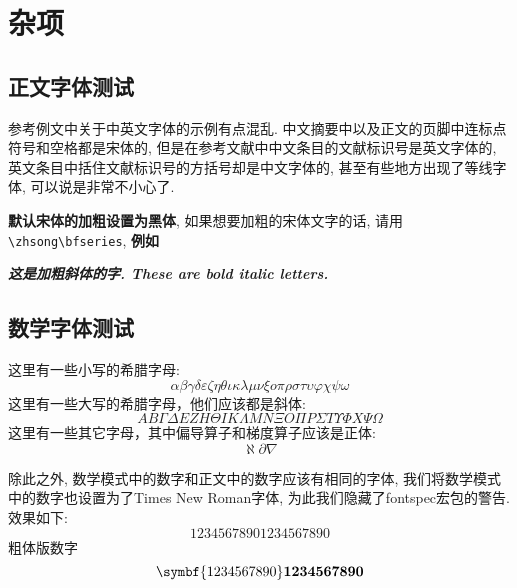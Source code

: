 
\section{杂项}

\subsection{正文字体测试}

参考例文中关于中英文字体的示例有点混乱. 中文摘要中以及正文的页脚中连标点符号和空格都是宋体的, 但是在参考文献中中文条目的文献标识号是英文字体的, 英文条目中括住文献标识号的方括号却是中文字体的, 甚至有些地方出现了等线字体, 可以说是非常不小心了.

{\bfseries 默认宋体的加粗设置为黑体}, 如果想要加粗的宋体文字的话, 请用\verb|\zhsong\bfseries|, {\zhsong\bfseries 例如\zhlipsum[1]}

{\bfseries\itshape 这是加粗斜体的字. These are bold italic letters. \zhlipsum[1]\lipsum[1]}

\subsection{数学字体测试}

这里有一些小写的希腊字母:
\begin{equation}
  \alpha \beta \gamma \delta \varepsilon \zeta \eta \theta \iota \kappa \lambda \mu \nu \xi o \pi \rho \sigma \tau \upsilon \varphi \chi \psi \omega
\end{equation}
这里有一些大写的希腊字母，他们应该都是斜体:
\begin{equation}
  A B \Gamma \Delta E Z H \Theta I K \Lambda M N \Xi O \Pi P \Sigma T \Upsilon \varPhi X \Psi \Omega
\end{equation}
这里有一些其它字母，其中偏导算子和梯度算子应该是正体:
\begin{equation}
  \aleph \partial \nabla
\end{equation}

除此之外, 数学模式中的数字和正文中的数字应该有相同的字体, 我们将数学模式中的数字也设置为了Times New Roman字体, 为此我们隐藏了fontspec宏包的警告. 效果如下:
\begin{equation}
  1234567890\text{1234567890}
\end{equation}
粗体版数字
\begin{equation}
  \symbf{1234567890}\text{\textbf{1234567890}}
\end{equation}

